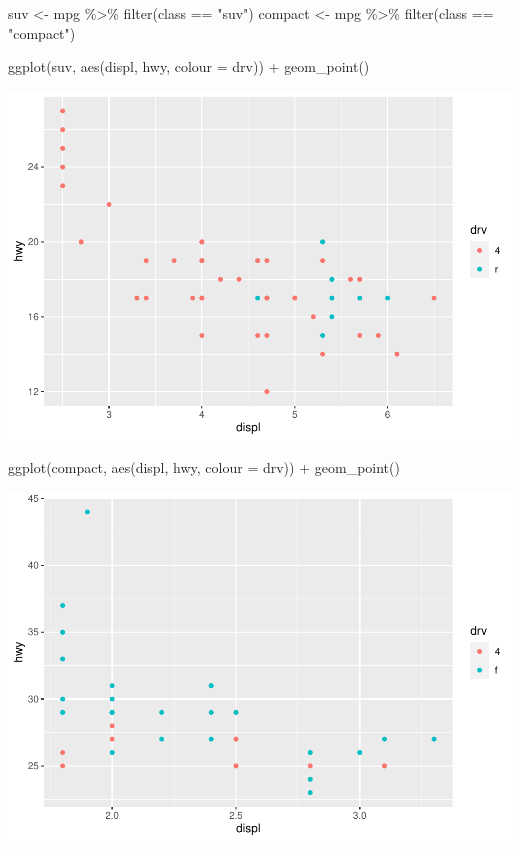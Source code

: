 \documentclass[
]{article}
\newenvironment{Shaded}{\begin{snugshade}}{\end{snugshade}}
\newcommand{\AttributeTok}[1]{\textcolor[rgb]{0.77,0.63,0.00}{#1}}
\newcommand{\FunctionTok}[1]{\textcolor[rgb]{0.00,0.00,0.00}{#1}}
\newcommand{\NormalTok}[1]{#1}
\newcommand{\OtherTok}[1]{\textcolor[rgb]{0.56,0.35,0.01}{#1}}
\newcommand{\SpecialCharTok}[1]{\textcolor[rgb]{0.00,0.00,0.00}{#1}}
\newcommand{\StringTok}[1]{\textcolor[rgb]{0.31,0.60,0.02}{#1}}
\begin{document}
\begin{Shaded}
\begin{Highlighting}[]
\NormalTok{suv }\OtherTok{\textless{}{-}}\NormalTok{ mpg }\SpecialCharTok{\%\textgreater{}\%} \FunctionTok{filter}\NormalTok{(class }\SpecialCharTok{==} \StringTok{"suv"}\NormalTok{)}
\NormalTok{compact }\OtherTok{\textless{}{-}}\NormalTok{ mpg }\SpecialCharTok{\%\textgreater{}\%} \FunctionTok{filter}\NormalTok{(class }\SpecialCharTok{==} \StringTok{"compact"}\NormalTok{)}

\FunctionTok{ggplot}\NormalTok{(suv, }\FunctionTok{aes}\NormalTok{(displ, hwy, }\AttributeTok{colour =}\NormalTok{ drv)) }\SpecialCharTok{+}
  \FunctionTok{geom\_point}\NormalTok{()}
\end{Highlighting}
\end{Shaded}

\includegraphics{Journal_files/figure-latex/unnamed-chunk-61-3.pdf}

\begin{Shaded}
\begin{Highlighting}[]
\FunctionTok{ggplot}\NormalTok{(compact, }\FunctionTok{aes}\NormalTok{(displ, hwy, }\AttributeTok{colour =}\NormalTok{ drv)) }\SpecialCharTok{+}
  \FunctionTok{geom\_point}\NormalTok{()}
\end{Highlighting}
\end{Shaded}

\includegraphics{Journal_files/figure-latex/unnamed-chunk-61-4.pdf}
\end{document}
